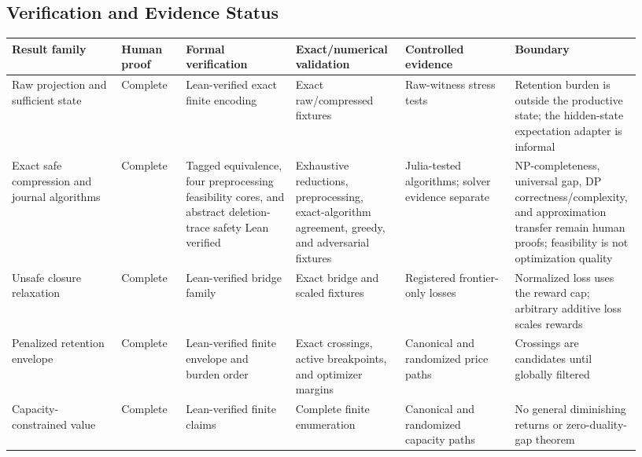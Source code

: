 \begin{landscape}
\section{Verification and Evidence Status}\label{app:validation-status}

\begingroup
\fontsize{8}{9.1}\selectfont
\setlength{\tabcolsep}{2.5pt}
\renewcommand{\arraystretch}{1.08}
\begin{center}
\begin{tabular}{@{}
  >{\raggedright\arraybackslash}p{0.17\linewidth}
  >{\raggedright\arraybackslash}p{0.10\linewidth}
  >{\raggedright\arraybackslash}p{0.17\linewidth}
  >{\raggedright\arraybackslash}p{0.17\linewidth}
  >{\raggedright\arraybackslash}p{0.17\linewidth}
  >{\raggedright\arraybackslash}p{0.15\linewidth}@{}}
\toprule
Result family & Human proof & Formal verification & Exact/numerical validation & Controlled evidence & Boundary \\
\midrule
Raw projection and sufficient state & Complete & Lean-verified exact finite encoding & Exact raw/compressed fixtures & Raw-witness stress tests & Retention burden is outside the productive state; the hidden-state expectation adapter is informal \\
Exact safe compression and journal algorithms & Complete & Tagged equivalence, four preprocessing feasibility cores, and abstract deletion-trace safety Lean verified & Exhaustive reductions, preprocessing, exact-algorithm agreement, greedy, and adversarial fixtures & Julia-tested algorithms; solver evidence separate & NP-completeness, universal gap, DP correctness/complexity, and approximation transfer remain human proofs; feasibility is not optimization quality \\
Unsafe closure relaxation & Complete & Lean-verified bridge family & Exact bridge and scaled fixtures & Registered frontier-only losses & Normalized loss uses the reward cap; arbitrary additive loss scales rewards \\
Penalized retention envelope & Complete & Lean-verified finite envelope and burden order & Exact crossings, active breakpoints, and optimizer margins & Canonical and randomized price paths & Crossings are candidates until globally filtered \\
Capacity-constrained value & Complete & Lean-verified finite claims & Complete finite enumeration & Canonical and randomized capacity paths & No general diminishing returns or zero-duality-gap theorem \\

\end{tabular}
\end{center}
\end{landscape}
